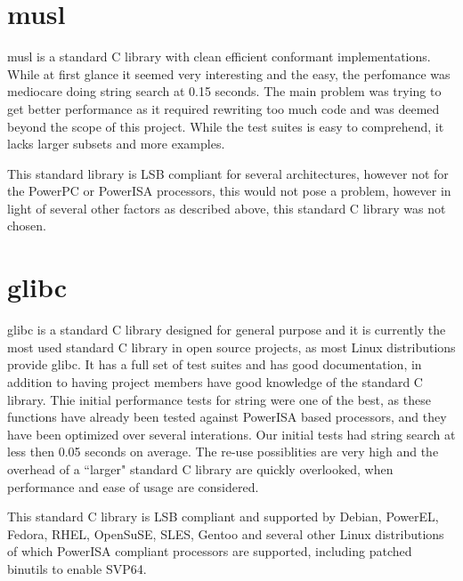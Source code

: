 \section{musl}
\label{content:musl}

musl is a standard C library with clean efficient conformant implementations.
While at first glance it seemed very interesting and the easy, the perfomance was mediocare doing string search at 0.15 seconds.
The main problem was trying to get better performance as it required rewriting too much code and was deemed beyond the scope of this project.
While the test suites is easy to comprehend, it lacks larger subsets and more examples.
\par

This standard library is \acrshort{LSB} compliant for several architectures, however not for the PowerPC or PowerISA processors,
this would not pose a problem, however in light of several other factors as described above, this standard C library was not chosen.
\par

\section{glibc}
\label{content:glibc}

glibc is a standard C library designed for general purpose and it is currently the most used standard C library in open source projects,
as most Linux distributions provide glibc.
It has a full set of test suites and has good documentation, in addition to having project members have good knowledge of the standard C library.
Thie initial performance tests for string were one of the best, as these functions have already been tested against PowerISA based processors,
and they have been optimized over several interations.
Our initial tests had string search at less then 0.05 seconds on average.
The re-use possiblities are very high and the overhead of a ``larger" standard C library are quickly overlooked,
when performance and ease of usage are considered.
\par

This standard C library is \acrshort{LSB} compliant and supported by Debian, PowerEL, Fedora, RHEL, OpenSuSE, SLES, Gentoo
and several other Linux distributions of which PowerISA compliant processors are supported, including patched binutils to enable SVP64.
\par
